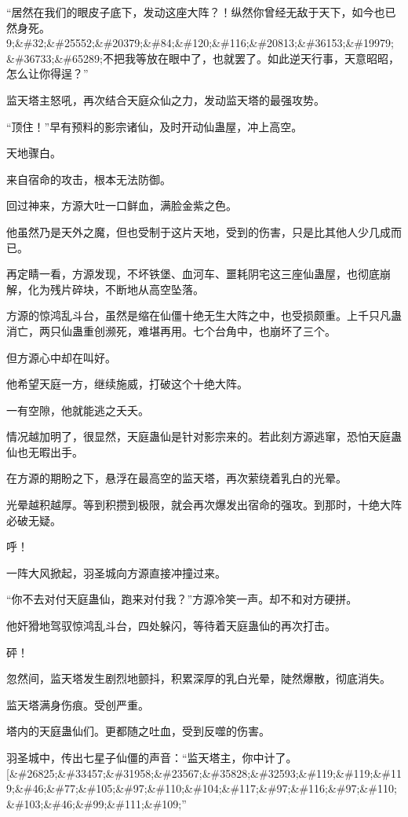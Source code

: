 
\begin{this_body}

“居然在我们的眼皮子底下，发动这座大阵？！纵然你曾经无敌于天下，如今也已然身死。9;\&\#32;\&\#25552;\&\#20379;\&\#84;\&\#120;\&\#116;\&\#20813;\&\#36153;\&\#19979;\&\#36733;\&\#65289;不把我等放在眼中了，也就罢了。如此逆天行事，天意昭昭，怎么让你得逞？”

监天塔主怒吼，再次结合天庭众仙之力，发动监天塔的最强攻势。

“顶住！”早有预料的影宗诸仙，及时开动仙蛊屋，冲上高空。

天地骤白。

来自宿命的攻击，根本无法防御。

回过神来，方源大吐一口鲜血，满脸金紫之色。

他虽然乃是天外之魔，但也受制于这片天地，受到的伤害，只是比其他人少几成而已。

再定睛一看，方源发现，不坏铁堡、血河车、噩耗阴宅这三座仙蛊屋，也彻底崩解，化为残片碎块，不断地从高空坠落。

方源的惊鸿乱斗台，虽然是缩在仙僵十绝无生大阵之中，也受损颇重。上千只凡蛊消亡，两只仙蛊重创濒死，难堪再用。七个台角中，也崩坏了三个。

但方源心中却在叫好。

他希望天庭一方，继续施威，打破这个十绝大阵。

一有空隙，他就能逃之夭夭。

情况越加明了，很显然，天庭蛊仙是针对影宗来的。若此刻方源逃窜，恐怕天庭蛊仙也无暇出手。

在方源的期盼之下，悬浮在最高空的监天塔，再次萦绕着乳白的光晕。

光晕越积越厚。等到积攒到极限，就会再次爆发出宿命的强攻。到那时，十绝大阵必破无疑。

呼！

一阵大风掀起，羽圣城向方源直接冲撞过来。

“你不去对付天庭蛊仙，跑来对付我？”方源冷笑一声。却不和对方硬拼。

他奸猾地驾驭惊鸿乱斗台，四处躲闪，等待着天庭蛊仙的再次打击。

砰！

忽然间，监天塔发生剧烈地颤抖，积累深厚的乳白光晕，陡然爆散，彻底消失。

监天塔满身伤痕。受创严重。

塔内的天庭蛊仙们。更都随之吐血，受到反噬的伤害。

羽圣城中，传出七星子仙僵的声音：“监天塔主，你中计了。[\&\#26825;\&\#33457;\&\#31958;\&\#23567;\&\#35828;\&\#32593;\&\#119;\&\#119;\&\#119;\&\#46;\&\#77;\&\#105;\&\#97;\&\#110;\&\#104;\&\#117;\&\#97;\&\#116;\&\#97;\&\#110;\&\#103;\&\#46;\&\#99;\&\#111;\&\#109;”


\end{this_body}

